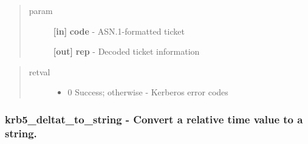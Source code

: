 \documentclass[letterpaper,10pt,english]{sphinxmanual}
\begin{document}
\begin{fulllineitems}
\label{appdev/refs/api/krb5_decode_ticket:krb5_decode_ticket}
\end{fulllineitems}

\begin{quote}\begin{description}
\item[{param}] \leavevmode
\textbf{{[}in{]}} \textbf{code} - ASN.1-formatted ticket

\textbf{{[}out{]}} \textbf{rep} - Decoded ticket information

\end{description}\end{quote}
\begin{quote}\begin{description}
\item[{retval}] \leavevmode\begin{itemize}
\item {} 
0   Success; otherwise - Kerberos error codes

\end{itemize}

\end{description}\end{quote}


\subsubsection{krb5\_deltat\_to\_string -  Convert a relative time value to a string.}
\label{appdev/refs/api/krb5_deltat_to_string::doc}\label{appdev/refs/api/krb5_deltat_to_string:krb5-deltat-to-string-convert-a-relative-time-value-to-a-string}

\begin{fulllineitems}
\label{appdev/refs/api/krb5_deltat_to_string:krb5_deltat_to_string}
\end{fulllineitems}
\end{document}
